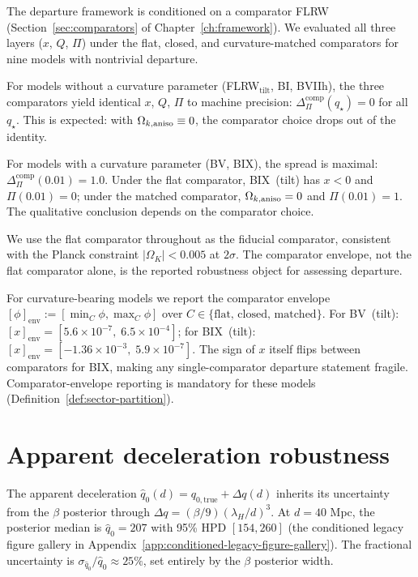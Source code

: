 The departure framework is conditioned on a comparator FLRW
(Section~\ref{sec:comparators} of Chapter~\ref{ch:framework}).
We evaluated all three layers ($x$, $Q$, $\Pi$) under the flat,
closed, and curvature-matched comparators for nine models with
nontrivial departure.

For models without a curvature parameter
(FLRW$_\mathrm{tilt}$, BI, BVIIh), the three comparators yield
identical $x$, $Q$, $\Pi$ to machine precision:
$\Delta_\Pi^{\mathrm{comp}}(q_\star) = 0$ for all $q_\star$.
This is expected: with $\Omega_{k,\mathrm{aniso}} \equiv 0$, the comparator
choice drops out of the identity.

For models with a curvature parameter (BV, BIX), the spread
is maximal: $\Delta_\Pi^{\mathrm{comp}}(0.01) = 1.0$.
Under the flat comparator, BIX~(tilt) has $x < 0$ and
$\Pi(0.01) = 0$; under the matched comparator, $\Omega_{k,\mathrm{aniso}} = 0$
and $\Pi(0.01) = 1$.  The qualitative conclusion depends on the
comparator choice.

We use the flat comparator throughout as the fiducial comparator,
consistent with the Planck constraint $|\Omega_K| < 0.005$ at
$2\sigma$.  The comparator envelope, not the flat comparator
alone, is the reported robustness object for assessing departure.

For curvature-bearing models we report the comparator envelope
$[\phi]_{\mathrm{env}} := [\min_C \phi, \max_C \phi]$ over
$C \in \{\text{flat, closed, matched}\}$.  For BV~(tilt):
$[x]_{\mathrm{env}} = [5.6 \times 10^{-7},\; 6.5 \times 10^{-4}]$;
for BIX~(tilt):
$[x]_{\mathrm{env}} = [-1.36 \times 10^{-3},\; 5.9 \times 10^{-7}]$.
The sign of $x$ itself flips between comparators for BIX,
making any single-comparator departure statement fragile.
Comparator-envelope reporting is mandatory for these models
(Definition~\ref{def:sector-partition}).


\section{Apparent deceleration robustness}
\label{sec:q0-robust}

The apparent deceleration $\hat{q}_0(d) = q_{0,\mathrm{true}}
+ \Delta q(d)$ inherits its uncertainty from the $\beta$
posterior through $\Delta q = (\beta/9)(\lambda_H/d)^3$.  At
$d = 40$ Mpc, the posterior median is $\hat{q}_0 = 207$ with
95\% HPD $[154, 260]$
(the conditioned legacy figure gallery in Appendix~\ref{app:conditioned-legacy-figure-gallery}).  The fractional uncertainty
is $\sigma_{\hat{q}_0}/\hat{q}_0 \approx 25\%$, set entirely
by the $\beta$ posterior width.

